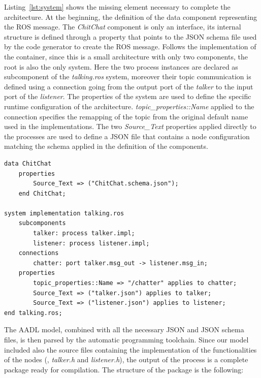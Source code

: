 Listing~\ref{lst:system} shows the missing element necessary to complete the architecture. At the beginning, the definition of the data component representing the ROS message. The \textit{ChitChat} component is only an interface, its internal structure is defined through a property that points to the JSON schema file used by the code generator to create the ROS message. Follows the implementation of the container, since this is a small architecture with only two components, the root is also the only system. Here the two process instances are declared as subcomponent of the \textit{talking.ros} system, moreover their topic communication is defined using a connection going from the output port of the \textit{talker} to the input port of the \textit{listener}. The properties of the system are used to define the specific runtime configuration of the architecture. \textit{topic\_properties::Name} applied to the connection specifies the remapping of the topic from the original default name used in the implementations. The two \textit{Source\_Text} properties applied directly to the processes are used to define a JSON file that contains a node configuration matching the schema applied in the definition of the components. 

\begin{lstlisting}[language=AADL,caption={TODO},label=lst:system]
data ChitChat
	properties
		Source_Text => ("ChitChat.schema.json");
	end ChitChat;
	
system implementation talking.ros
	subcomponents
		talker: process talker.impl;
		listener: process listener.impl;
	connections
		chatter: port talker.msg_out -> listener.msg_in;
	properties
		topic_properties::Name => "/chatter" applies to chatter;
		Source_Text => ("talker.json") applies to talker;
		Source_Text => ("listener.json") applies to listener;
end talking.ros;
\end{lstlisting}

The AADL model, combined with all the necessary JSON and JSON schema files, is then parsed by the automatic programming toolchain. Since our model included also the source files containing the implementation of the functionalities of the nodes (\ie, \textit{talker.h} and \textit{listener.h}), the output of the process is a complete package ready for compilation. The structure of the package is the following:

